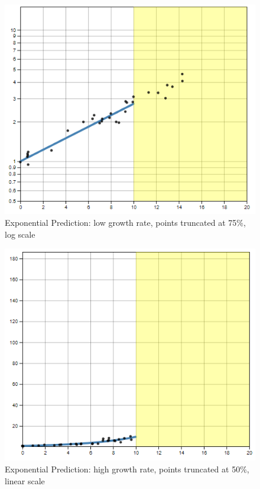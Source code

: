 \documentclass[print]{nuthesis}
\begin{document}
\begin{figure}[tbp]

{\centering \includegraphics[width=0.65\linewidth,]{images/low-15-log} 

}

\caption{Exponential Prediction: low growth rate, points truncated at 75\%, log scale}\label{fig:low-15-log}
\end{figure}

\begin{figure}[tbp]

{\centering \includegraphics[width=0.65\linewidth,]{images/high-10-linear} 

}

\caption{Exponential Prediction: high growth rate, points truncated at 50\%, linear scale}\label{fig:high-10-linear}
\end{figure}
\end{document}
